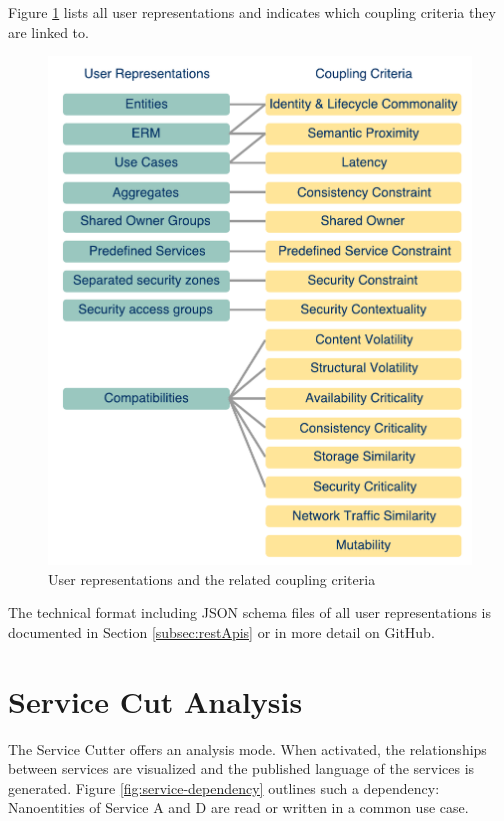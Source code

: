 Figure \ref{fig:userrep} lists all user representations and indicates which coupling criteria they are linked to.

\begin{figure}[H]
	\begin{center}
		\includegraphics[scale=0.6]{diagrams/UserRep-CC.pdf}
		\caption{User representations and the related coupling criteria}
		\label{fig:userrep}
	\end{center}
\end{figure}

The technical format including \gls{JSON} schema files of all user representations is documented in Section \ref{subsec:restApis} or in more detail on GitHub\cite{githubWiki}. 

\section{Service Cut Analysis}

The Service Cutter offers an analysis mode. When activated, the relationships between services are visualized and the published language of the services is generated. Figure \ref{fig:service-dependency} outlines such a dependency: Nanoentities of Service A and D are read or written in a common use case. 

